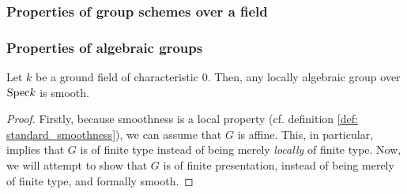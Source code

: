            \subsubsection{Properties of group schemes over a field}
                
            \subsubsection{Properties of algebraic groups}
                \begin{theorem} \label{theorem: algebraic_groups_over_characteristic_0_are_smooth} 
                    Let $k$ be a ground field of characteristic $0$. Then, any locally algebraic group over $\mathrm{Spec} k$ is smooth.
                \end{theorem}
                    \begin{proof}
                        Firstly, because smoothness is a local property (cf. definition \ref{def: standard_smoothness}), we can assume that $G$ is affine. This, in particular, implies that $G$ is of finite type instead of being merely \textit{locally} of finite type. Now, we will attempt to show that $G$ is of finite presentation, instead of being merely of finite type, and formally smooth. 
                    \end{proof}
                    
